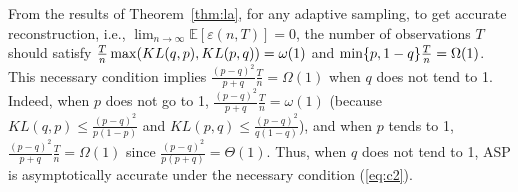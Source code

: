 From the results of Theorem~\ref{thm:la}, for any adaptive sampling, to get accurate reconstruction, i.e., $\lim_{n\rightarrow \infty} \mathbb{E}[\varepsilon (n,T)] = 0$, the number of observations $T$ should satisfy ${T\over n}\max(KL(q,p),KL(p,q))=\omega(1)$ and $\min\{p,1-q\}{T\over n}=\Omega(1)$. This necessary condition implies $\frac{(p-q)^2}{p+q}\frac{T}{n} =\Omega(1)$ when $q$ does not tend to 1. Indeed, when $p$ does not go to 1, $\frac{(p-q)^2}{p+q}\frac{T}{n} = \omega(1)$  (because $KL(q,p) \le \frac{(p-q)^2}{p(1-p)}$ and $KL(p,q) \le \frac{(p-q)^2}{q(1-q)}$), and when $p$ tends to 1, $\frac{(p-q)^2}{p+q}\frac{T}{n} =\Omega(1)$ since $ \frac{(p-q)^2}{p(p+q)} = \Theta(1)$. Thus, when $q$ does not tend to 1, ASP is asymptotically accurate under the necessary condition (\ref{eq:c2}).







